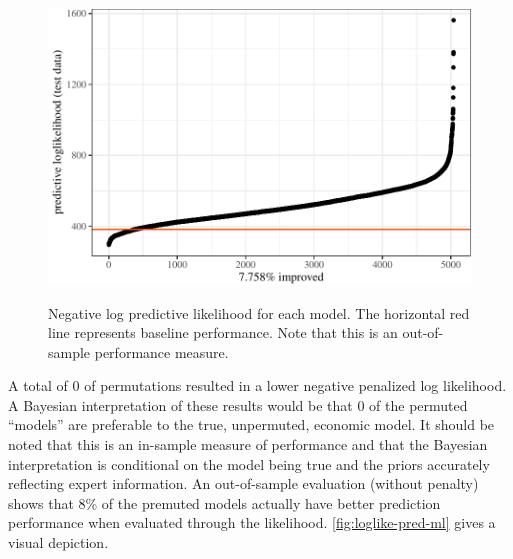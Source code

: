 \documentclass[11pt]{article}
\begin{document}
\begin{figure}[t]

{\centering \includegraphics{gfx/loglike-pred-ml-1} }

\caption{Negative log predictive likelihood for each model. The horizontal red line represents baseline performance. Note that this is an out-of-sample performance measure.}\label{fig:loglike-pred-ml}
\end{figure}

A total of 0 of permutations resulted in a lower negative penalized log
likelihood. A Bayesian interpretation of these results would be that 0
of the permuted ``models'' are preferable to the true, unpermuted,
economic model. It should be noted that this is an in-sample measure of
performance and that the Bayesian interpretation is conditional on the
model being true and the priors accurately reflecting expert
information. An out-of-sample evaluation (without penalty) shows that
8\% of the premuted models actually have better prediction performance
when evaluated through the likelihood. \autoref{fig:loglike-pred-ml}
gives a visual depiction.

\begin{table}

\caption{\label{tab:best-results}Series MSEs for SW and top models.}
\centering
{}
\end{table}
\end{document}
